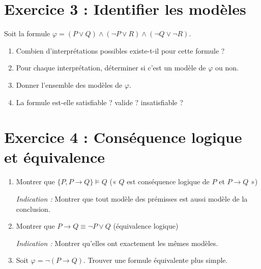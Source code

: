 \documentclass[11pt,a4paper]{article}
\begin{document}
\section*{Exercice 3 : Identifier les modèles}

\begin{exercice}
Soit la formule $\varphi = (P \lor Q) \land (\neg P \lor R) \land (\neg Q \lor \neg R)$.

\begin{enumerate}[label=\alph*)]
    \item Combien d'interprétations possibles existe-t-il pour cette formule ?
    \item Pour chaque interprétation, déterminer si c'est un modèle de $\varphi$ ou non.
    \item Donner l'ensemble des modèles de $\varphi$.
    \item La formule est-elle satisfiable ? valide ? insatisfiable ?
\end{enumerate}
\end{exercice}

\section*{Exercice 4 : Conséquence logique et équivalence}

\begin{exercice}
\begin{enumerate}
    \item Montrer que $\{P, P \rightarrow Q\} \models Q$ (« $Q$ est conséquence logique de $P$ et $P \rightarrow Q$ »)
    
    \textit{Indication :} Montrer que tout modèle des prémisses est aussi modèle de la conclusion.
    
    \item Montrer que $P \rightarrow Q \equiv \neg P \lor Q$ (équivalence logique)
    
    \textit{Indication :} Montrer qu'elles ont exactement les mêmes modèles.
    
    \item Soit $\varphi = \neg(P \rightarrow Q)$. Trouver une formule équivalente plus simple.
\end{enumerate}
\end{exercice}
\end{document}
